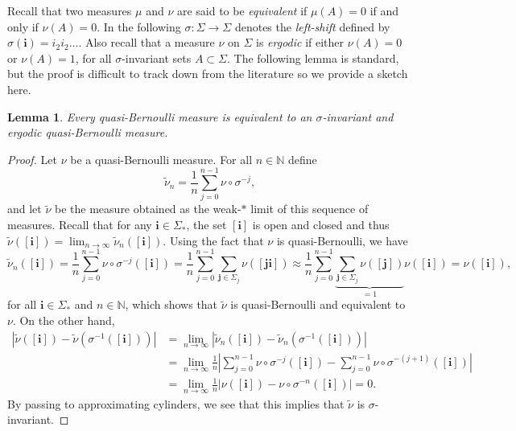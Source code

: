 \documentclass{PRM}
\newcommand{\field}[1]{\mathbb{#1}}
\newcommand{\N}{\field{N}}
\newcommand{\iii}{\mathbf{i}}
\theoremstyle{plain}
\newtheorem{lemma}[thm]{Lemma}
\theoremstyle{definition}
\theoremstyle{remark}
\begin{document}
Recall that two measures $\mu$ and $\nu$ are said to be \emph{equivalent} if $\mu(A)=0$ if and only if $\nu(A)=0$. In the following $\sigma\colon \Sigma\to\Sigma$ denotes the \emph{left-shift} defined by $\sigma(\iii)=i_2i_2\ldots$. Also recall that a measure $\nu$ on $\Sigma$ is \emph{ergodic} if either $\nu(A)=0$ or $\nu(A)=1$, for all $\sigma$-invariant sets $A\subset \Sigma$. The following lemma is standard, but the proof is difficult to track down from the literature so we provide a sketch here.

\begin{lemma}\label{lemma:quasi-bernoulli-equivalence}
Every quasi-Bernoulli measure is equivalent to an $\sigma$-invariant and ergodic quasi-Bernoulli measure.
\end{lemma}
\begin{proof}
Let $\nu$ be a quasi-Bernoulli measure. For all $n\in\N$ define
\begin{equation*}
    \tilde{\nu}_n=\frac{1}{n}\sum_{j=0}^{n-1}\nu\circ\sigma^{-j},
\end{equation*}
and let $\tilde{\nu}$ be the measure obtained as the weak-$*$ limit of this sequence of measures. Recall that for any $\mathbf{i}\in\Sigma_*$, the set $[\mathbf{i}]$ is open and closed and thus $\tilde{\nu}([\mathbf{i}])=\lim_{n\to\infty}\tilde{\nu}_n([\mathbf{i}])$. Using the fact that $\nu$ is quasi-Bernoulli, we have
\begin{equation*}
    \tilde{\nu}_n([\mathbf{i}])=\frac{1}{n}\sum_{j=0}^{n-1}\nu\circ\sigma^{-j}([\mathbf{i}])=\frac{1}{n}\sum_{j=0}^{n-1}\sum_{\mathbf{j}\in\Sigma_j}\nu([\mathbf{j}\mathbf{i}])\approx \frac{1}{n}\sum_{j=0}^{n-1}\underbrace{\sum_{\mathbf{j}\in\Sigma_j}\nu([\mathbf{j}])}_{=1}\nu([\mathbf{i}])=\nu([\mathbf{i}]),
\end{equation*}
for all $\mathbf{i}\in\Sigma_*$ and $n\in\N$, which shows that $\tilde{\nu}$ is quasi-Bernoulli and equivalent to $\nu$. On the other hand,
\begin{align*}
    |\tilde{\nu}([\mathbf{i}])-\tilde{\nu}(\sigma^{-1}([\mathbf{i}]))|&=\lim_{n\to\infty}|\tilde{\nu}_n([\mathbf{i}])-\tilde{\nu}_n(\sigma^{-1}([\mathbf{i}]))|\\
    &=\lim_{n\to\infty}\frac{1}{n}\left|\sum_{j=0}^{n-1}\nu\circ\sigma^{-j}([\mathbf{i}])-\sum_{j=0}^{n-1}\nu\circ\sigma^{-(j+1)}([\mathbf{i}])\right|\\
    &=\lim_{n\to\infty}\frac{1}{n}\left|\nu([\mathbf{i}])-\nu\circ\sigma^{-n}([\mathbf{i}])\right|=0.
\end{align*}
By passing to approximating cylinders, we see that this implies that $\tilde{\nu}$ is $\sigma$-invariant. 



\end{proof}
\end{document}
